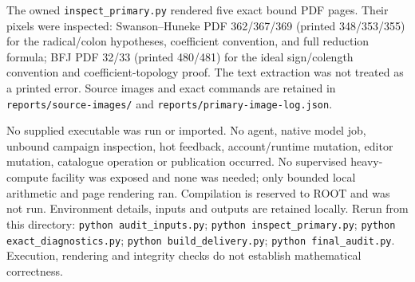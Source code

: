 The owned \texttt{inspect\_primary.py} rendered five exact bound PDF pages. Their pixels were inspected: Swanson--Huneke PDF 362/367/369 (printed 348/353/355) for the radical/colon hypotheses, coefficient convention, and full reduction formula; BFJ PDF 32/33 (printed 480/481) for the ideal sign/colength convention and coefficient-topology proof. The text extraction was not treated as a printed error. Source images and exact commands are retained in \texttt{reports/source-images/} and \texttt{reports/primary-image-log.json}.

No supplied executable was run or imported. No agent, native model job, unbound campaign inspection, hot feedback, account/runtime mutation, editor mutation, catalogue operation or publication occurred. No supervised heavy-compute facility was exposed and none was needed; only bounded local arithmetic and page rendering ran. Compilation is reserved to ROOT and was not run. Environment details, inputs and outputs are retained locally. Rerun from this directory: \texttt{python audit\_inputs.py}; \texttt{python inspect\_primary.py}; \texttt{python exact\_diagnostics.py}; \texttt{python build\_delivery.py}; \texttt{python final\_audit.py}. Execution, rendering and integrity checks do not establish mathematical correctness.
